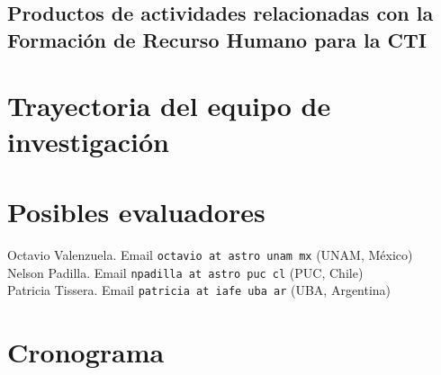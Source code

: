 \documentclass[12pt]{article}
\begin{document}
\subsection{Productos de actividades relacionadas con la Formación de Recurso
Humano para la CTI }



\section{Trayectoria del equipo de investigaci\'on}


\section{Posibles evaluadores}

\noindent
Octavio Valenzuela. Email {\texttt{octavio at astro unam mx}} (UNAM, M\'exico)\\
Nelson Padilla. Email {\texttt{npadilla at astro puc cl}} (PUC, Chile)\\
Patricia Tissera. Email {\texttt{patricia at iafe uba ar}} (UBA, Argentina)\\

\section{Cronograma}
\end{document}
